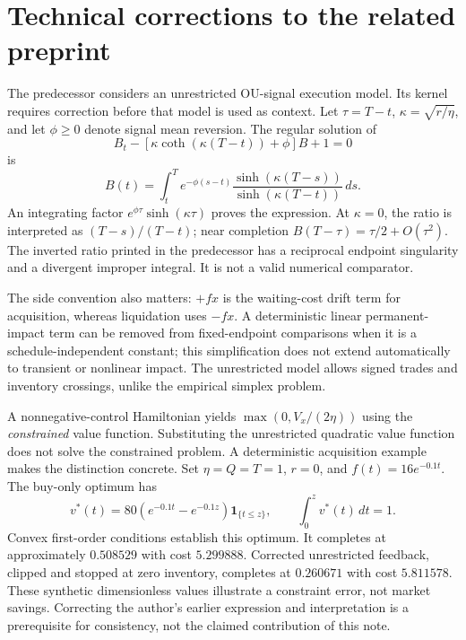 \documentclass[11pt]{article}
\begin{document}
\section{Technical corrections to the related preprint}
The predecessor \citep{lai2026} considers an unrestricted OU-signal execution model. Its kernel requires correction before that model is used as context. Let $\tau=T-t$, $\kappa=\sqrt{r/\eta}$, and let $\phi\geq0$ denote signal mean reversion. The regular solution of
\begin{equation}
 B_t-[\kappa\coth(\kappa(T-t))+\phi]B+1=0
\end{equation}
is
\begin{equation}\label{eq:kernel}
 B(t)=\int_t^T e^{-\phi(s-t)}
       \frac{\sinh(\kappa(T-s))}{\sinh(\kappa(T-t))}\,ds.
\end{equation}
An integrating factor $e^{\phi\tau}\sinh(\kappa\tau)$ proves the expression. At $\kappa=0$, the ratio is interpreted as $(T-s)/(T-t)$; near completion $B(T-\tau)=\tau/2+O(\tau^2)$. The inverted ratio printed in the predecessor has a reciprocal endpoint singularity and a divergent improper integral. It is not a valid numerical comparator.

The side convention also matters: $+fx$ is the waiting-cost drift term for acquisition, whereas liquidation uses $-fx$. A deterministic linear permanent-impact term can be removed from fixed-endpoint comparisons when it is a schedule-independent constant; this simplification does not extend automatically to transient or nonlinear impact. The unrestricted model allows signed trades and inventory crossings, unlike the empirical simplex problem.

A nonnegative-control Hamiltonian yields $\max(0,V_x/(2\eta))$ using the \emph{constrained} value function. Substituting the unrestricted quadratic value function does not solve the constrained problem. A deterministic acquisition example makes the distinction concrete. Set $\eta=Q=T=1$, $r=0$, and $f(t)=16e^{-0.1t}$. The buy-only optimum has
\begin{equation}
 v^*(t)=80(e^{-0.1t}-e^{-0.1z})\mathbf1_{\{t\leq z\}},
 \qquad \int_0^z v^*(t)\,dt=1.
\end{equation}
Convex first-order conditions establish this optimum. It completes at approximately $0.508529$ with cost $5.299888$. Corrected unrestricted feedback, clipped and stopped at zero inventory, completes at $0.260671$ with cost $5.811578$. These synthetic dimensionless values illustrate a constraint error, not market savings. Correcting the author's earlier expression and interpretation is a prerequisite for consistency, not the claimed contribution of this note.
\end{document}
